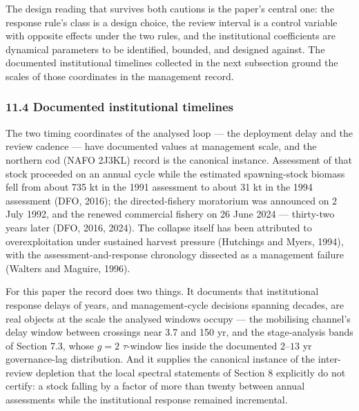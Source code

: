 \documentclass[11pt]{article}
\begin{document}
The design reading that survives both cautions is the paper's central
one: the response rule's class is a design choice, the review interval
is a control variable with opposite effects under the two rules, and the
institutional coefficients are dynamical parameters to be identified,
bounded, and designed against. The documented institutional timelines
collected in the next subsection ground the scales of those coordinates
in the management record.

\subsubsection{11.4 Documented institutional
timelines}\label{documented-institutional-timelines}

The two timing coordinates of the analysed loop --- the deployment delay
and the review cadence --- have documented values at management scale,
and the northern cod (NAFO 2J3KL) record is the canonical instance.
Assessment of that stock proceeded on an annual cycle while the
estimated spawning-stock biomass fell from about 735 kt in the 1991
assessment to about 31 kt in the 1994 assessment (DFO, 2016); the
directed-fishery moratorium was announced on 2 July 1992, and the
renewed commercial fishery on 26 June 2024 --- thirty-two years later
(DFO, 2016, 2024). The collapse itself has been attributed to
overexploitation under sustained harvest pressure (Hutchings and Myers,
1994), with the assessment-and-response chronology dissected as a
management failure (Walters and Maguire, 1996).

For this paper the record does two things. It documents that
institutional response delays of years, and management-cycle decisions
spanning decades, are real objects at the scale the analysed windows
occupy --- the mobilising channel's delay window between crossings near
3.7 and 150 yr, and the stage-analysis bands of Section 7.3, whose
\(g=2\) \(\tau\)-window lies inside the documented \(2\)--\(13\) yr
governance-lag distribution. And it supplies the canonical instance of
the inter-review depletion that the local spectral statements of Section
8 explicitly do not certify: a stock falling by a factor of more than
twenty between annual assessments while the institutional response
remained incremental.
\end{document}

